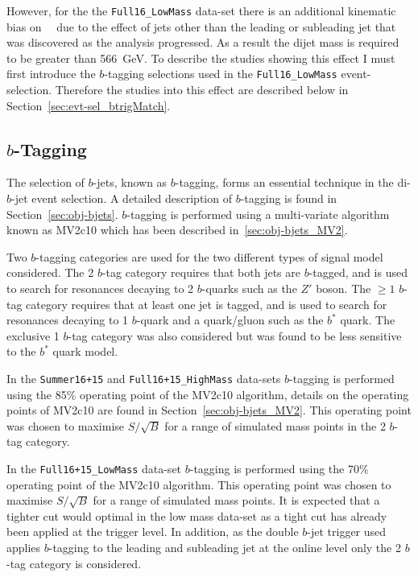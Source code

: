 However, for the the \verb|Full16_LowMass| data-set
there is an additional kinematic bias on~\mjj~
due to the effect of jets other than the leading or subleading jet
that was discovered as the analysis progressed.
As a result the dijet mass is required to be greater than 566~GeV.
To describe the studies showing this effect I must first introduce
the $b$-tagging selections used in the \verb|Full16_LowMass| event-selection.
Therefore the studies into this effect are described below in Section~\ref{sec:evt-sel_btrigMatch}.

\subsection{$b$-Tagging}
\label{sec:evt-sel-btag}

The selection of $b$-jets, known as $b$-tagging,
forms an essential technique in the di-$b$-jet event selection.
A detailed description of $b$-tagging is found in Section~\ref{sec:obj-bjets}.
$b$-tagging is performed using a multi-variate algorithm known as MV2c10 which has been described in~\ref{sec:obj-bjets_MV2}.

Two $b$-tagging categories are used for the two different types of signal model considered.
The 2 $b$-tag category requires that both jets are $b$-tagged,
and is used to search for resonances decaying to 2 $b$-quarks such as the $Z'$ boson.
The $\geq 1$ $b$-tag category requires that at least one jet is tagged,
and is used to search for resonances decaying to 1 $b$-quark and a quark/gluon such as the $b^*$ quark.
The exclusive 1 $b$-tag category was also considered but was found to be less sensitive to the $b^*$ quark model.

In the \verb|Summer16+15| and \verb|Full16+15_HighMass| data-sets
$b$-tagging is performed using the 85\% operating point of the MV2c10 algorithm,
details on the operating points of MV2c10 are found in Section~\ref{sec:obj-bjets_MV2}.
This operating point was chosen to maximise $S/\sqrt{B}$ for a range of simulated mass points in the 2 $b$-tag category.

In the \verb|Full16+15_LowMass| data-set $b$-tagging is performed using the 70\% operating point of the MV2c10 algorithm.
This operating point was chosen to maximise $S/\sqrt{B}$ for a range of simulated mass points.
It is expected that a tighter cut would optimal in the low mass data-set as a tight cut has already been applied at the trigger level.
In addition, as the double $b$-jet trigger used applies $b$-tagging to the leading and subleading jet at the online level
only the 2 $b$-tag category is considered.

